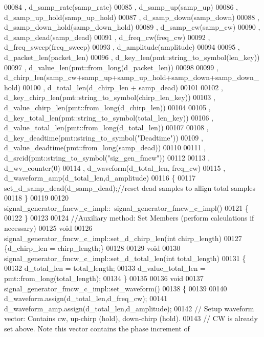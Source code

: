 \begin{DoxyCode}
00084       , d\_samp\_rate(samp\_rate)
00085       , d\_samp\_up(samp\_up)
00086       , d\_samp\_up\_hold(samp\_up\_hold)
00087       , d\_samp\_down(samp\_down)
00088       , d\_samp\_down\_hold(samp\_down\_hold)
00089       , d\_samp\_cw(samp\_cw)
00090       , d\_samp\_dead(samp\_dead)
00091       , d\_freq\_cw(freq\_cw)
00092       , d\_freq\_sweep(freq\_sweep)
00093       , d\_amplitude(amplitude)
00094 
00095       , d\_packet\_len(packet\_len)
00096       , d\_key\_len(pmt::string\_to\_symbol(len\_key))
00097       , d\_value\_len(pmt::from\_long(d\_packet\_len))
00098 
00099       , d\_chirp\_len(samp\_cw+samp\_up+samp\_up\_hold+samp\_down+samp\_down\_hold)
00100       , d\_total\_len(d\_chirp\_len + samp\_dead)
00101 
00102       , d\_key\_chirp\_len(pmt::string\_to\_symbol(chirp\_len\_key))
00103       , d\_value\_chirp\_len(pmt::from\_long(d\_chirp\_len))
00104 
00105       , d\_key\_total\_len(pmt::string\_to\_symbol(total\_len\_key))
00106       , d\_value\_total\_len(pmt::from\_long(d\_total\_len))
00107 
00108       , d\_key\_deadtime(pmt::string\_to\_symbol(\textcolor{stringliteral}{"Deadtime"}))
00109       , d\_value\_deadtime(pmt::from\_long(samp\_dead))
00110 
00111       , d\_srcid(pmt::string\_to\_symbol(\textcolor{stringliteral}{"sig\_gen\_fmcw"}))
00112 
00113       , d\_wv\_counter(0)
00114       , d\_waveform(d\_total\_len, freq\_cw)
00115       , d\_waveform\_amp(d\_total\_len,d\_amplitude)
00116     \{
00117       set_d_samp_dead(d_samp_dead);\textcolor{comment}{//reset dead samples to allign total samples}
00118     \}
00119 
00120     signal_generator_fmcw_c_impl::~signal_generator_fmcw_c_impl()
00121     \{
00122     \}
00123 
00124     \textcolor{comment}{//Auxiliary method: Set Members (perform calculations if necessary)}
00125     \textcolor{keywordtype}{void}
00126     signal_generator_fmcw_c_impl::set_d_chirp_len(\textcolor{keywordtype}{int} chirp\_length)
00127     \{d_chirp_len = chirp\_length;\}
00128 
00129     \textcolor{keywordtype}{void}
00130     signal_generator_fmcw_c_impl::set_d_total_len(\textcolor{keywordtype}{int} total\_length)
00131     \{
00132       d_total_len = total\_length;
00133       d_value_total_len = pmt::from\_long(total\_length);
00134     \}
00135 
00136     \textcolor{keywordtype}{void}
00137     signal_generator_fmcw_c_impl::set_waveform()
00138     \{
00139 
00140       d_waveform.assign(d_total_len,d_freq_cw);
00141       d_waveform_amp.assign(d_total_len,d_amplitude);
00142       \textcolor{comment}{// Setup waveform vector: Contains cw, up-chirp (hold), down-chirp (hold).}
00143       \textcolor{comment}{// CW is already set above. Note this vector contains the phase increment of}

\end{DoxyCode}

